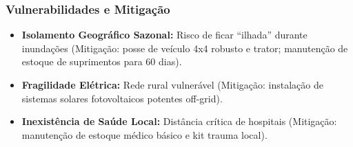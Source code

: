 \subsubsection{Vulnerabilidades e
Mitigação}

\begin{itemize}
\tightlist
\item
  \textbf{Isolamento Geográfico Sazonal:} Risco de ficar ``ilhada''
  durante inundações (Mitigação: posse de veículo 4x4 robusto e trator;
  manutenção de estoque de suprimentos para 60 dias).
\item
  \textbf{Fragilidade Elétrica:} Rede rural vulnerável (Mitigação:
  instalação de sistemas solares fotovoltaicos potentes off-grid).
\item
  \textbf{Inexistência de Saúde Local:} Distância crítica de hospitais
  (Mitigação: manutenção de estoque médico básico e kit trauma local).
\end{itemize}

